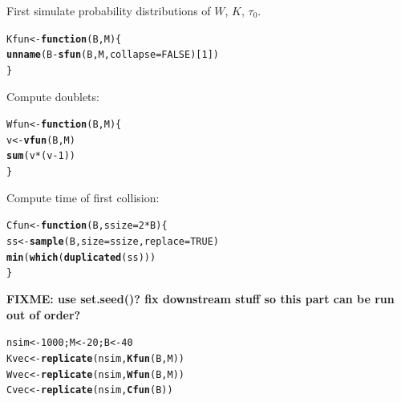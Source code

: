 \documentclass{article}\usepackage[]{graphicx}\usepackage[]{color}
\makeatletter
\newcommand{\hlnum}[1]{\textcolor[rgb]{0.686,0.059,0.569}{#1}}%
\newcommand{\hlopt}[1]{\textcolor[rgb]{0,0,0}{#1}}%
\newcommand{\hlstd}[1]{\textcolor[rgb]{0.345,0.345,0.345}{#1}}%
\newcommand{\hlkwa}[1]{\textcolor[rgb]{0.161,0.373,0.58}{\textbf{#1}}}%
\newcommand{\hlkwb}[1]{\textcolor[rgb]{0.69,0.353,0.396}{#1}}%
\newcommand{\hlkwc}[1]{\textcolor[rgb]{0.333,0.667,0.333}{#1}}%
\newcommand{\hlkwd}[1]{\textcolor[rgb]{0.737,0.353,0.396}{\textbf{#1}}}%
\newenvironment{kframe}{%
 \def\at@end@of@kframe{}%
 \ifinner\ifhmode%
  \def\at@end@of@kframe{\end{minipage}}%
  \begin{minipage}{\columnwidth}%
 \fi\fi%
 \def\FrameCommand##1{\hskip\@totalleftmargin \hskip-\fboxsep
 \colorbox{shadecolor}{##1}\hskip-\fboxsep
     \hskip-\linewidth \hskip-\@totalleftmargin \hskip\columnwidth}%
 \MakeFramed {\advance\hsize-\width
   \@totalleftmargin\z@ \linewidth\hsize
   \@setminipage}}%
 {\par\unskip\endMakeFramed%
 \at@end@of@kframe}
\newenvironment{knitrout}{}{} %
\newcommand{\fixme}[1]{\textbf{FIXME: #1}}
\makeatother
\begin{document}
First simulate probability distributions of $W$, $K$, $\tau_0$.
\begin{knitrout}
\color{fgcolor}\begin{kframe}
\begin{alltt}
\hlstd{Kfun} \hlkwb{<-} \hlkwa{function}\hlstd{(}\hlkwc{B}\hlstd{,}\hlkwc{M}\hlstd{) \{}
    \hlkwd{unname}\hlstd{(B}\hlopt{-}\hlkwd{sfun}\hlstd{(B,M,}\hlkwc{collapse}\hlstd{=}\hlnum{FALSE}\hlstd{)[}\hlnum{1}\hlstd{])}
\hlstd{\}}
\end{alltt}
\end{kframe}
\end{knitrout}

Compute doublets:
\begin{knitrout}
\color{fgcolor}\begin{kframe}
\begin{alltt}
\hlstd{Wfun} \hlkwb{<-} \hlkwa{function}\hlstd{(}\hlkwc{B}\hlstd{,}\hlkwc{M}\hlstd{) \{}
    \hlstd{v} \hlkwb{<-} \hlkwd{vfun}\hlstd{(B,M)}
    \hlkwd{sum}\hlstd{(v}\hlopt{*}\hlstd{(v}\hlopt{-}\hlnum{1}\hlstd{))}
\hlstd{\}}
\end{alltt}
\end{kframe}
\end{knitrout}

Compute time of first collision:
\begin{knitrout}
\color{fgcolor}\begin{kframe}
\begin{alltt}
\hlstd{Cfun} \hlkwb{<-} \hlkwa{function}\hlstd{(}\hlkwc{B}\hlstd{,}\hlkwc{ssize}\hlstd{=}\hlnum{2}\hlopt{*}\hlstd{B) \{}
    \hlstd{ss} \hlkwb{<-} \hlkwd{sample}\hlstd{(B,}\hlkwc{size}\hlstd{=ssize,}\hlkwc{replace}\hlstd{=}\hlnum{TRUE}\hlstd{)}
    \hlkwd{min}\hlstd{(}\hlkwd{which}\hlstd{(}\hlkwd{duplicated}\hlstd{(ss)))}
\hlstd{\}}
\end{alltt}
\end{kframe}
\end{knitrout}

\fixme{use set.seed()? fix downstream stuff so this part
can be run out of order?}
\begin{knitrout}
\color{fgcolor}\begin{kframe}
\begin{alltt}
\hlstd{nsim} \hlkwb{<-} \hlnum{1000}\hlstd{; M} \hlkwb{<-} \hlnum{20}\hlstd{; B} \hlkwb{<-} \hlnum{40}
\hlstd{Kvec} \hlkwb{<-} \hlkwd{replicate}\hlstd{(nsim,}\hlkwd{Kfun}\hlstd{(B,M))}
\hlstd{Wvec} \hlkwb{<-} \hlkwd{replicate}\hlstd{(nsim,}\hlkwd{Wfun}\hlstd{(B,M))}
\hlstd{Cvec} \hlkwb{<-} \hlkwd{replicate}\hlstd{(nsim,}\hlkwd{Cfun}\hlstd{(B))}
\end{alltt}
\end{kframe}
\end{knitrout}
\end{document}
